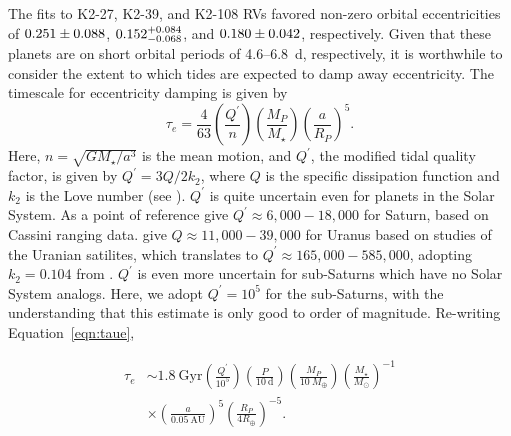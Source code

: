 \documentclass[preprint2]{aastex6}
\newcommand{\Mstar}{\ensuremath{M_{\star}}\xspace}
\newcommand{\Mp}{\ensuremath{M_{P}}\xspace}
\newcommand{\Qprime}{\ensuremath{Q^{\prime}}\xspace}
\newcommand{\Rp}{\ensuremath{R_P}\xspace}
\newcommand{\AU}{\ensuremath{\mathrm{AU}}\xspace}
\newcommand{\Me}{\ensuremath{M_{\oplus}}\xspace}
\renewcommand{\Re}{\ensuremath{R_{\oplus}}\xspace}
\newcommand{\Msun}{\ensuremath{M_{\odot}}\xspace}
\begin{document}
The fits to K2-27, K2-39, and K2-108 RVs favored non-zero orbital eccentricities of $\val{K2-27-ecc}{e1}$, $\val{K2-39-ecc}{e1}$, and $\val{epic2117-ecc}{e1}$, respectively. Given that these planets are on short orbital periods of 4.6--6.8~d, respectively, it is worthwhile to consider the extent to which tides are expected to damp away eccentricity. The timescale for eccentricity damping \citep{Goldreich66} is given by 
\begin{equation}
\label{eqn:taue}
    \tau_e = \frac{4}{63} 
                 \left(\frac{\Qprime}{n}\right) 
                 \left(\frac{\Mp}{\Mstar}\right)
                 \left(\frac{a}{\Rp}\right)^5.
\end{equation}
Here, $n = \sqrt{G \Mstar / a^3}$ is the mean motion, and \Qprime, the modified tidal quality factor, is given by $\Qprime = 3 Q / 2 k_2$, where $Q$ is the specific dissipation function and $k_2$ is the Love number (see \citealt{Goldreich66,Murray99,Mardling04}). \Qprime is quite uncertain even for planets in the Solar System. As a point of reference \cite{Lainey15} give $\Qprime \approx 6,000-18,000$ for Saturn, based on Cassini ranging data. \cite{Tittemore89,Tittemore90} give $Q \approx 11,000-39,000$ for Uranus based on studies of the Uranian satilites, which translates to $\Qprime \approx 165,000-585,000$, adopting $k_2 = 0.104$ from \citep{Gavrilov77}. \Qprime is even more uncertain for sub-Saturns which have no Solar System analogs. Here, we adopt $\Qprime = 10^5$ for the sub-Saturns, with the understanding that this estimate is only good to order of magnitude. Re-writing Equation~\ref{eqn:taue},

\begin{eqnarray}
    \tau_e & \sim 1.8~\mathrm{Gyr} 
                \left(\frac{\Qprime}{10^5}\right) 
                \left(\frac{P}{10~\mathrm{d}}\right)
                \left(\frac{\Mp}{10~\Me}\right)
                \left(\frac{\Mstar}{\Msun}\right)^{-1} \nonumber\\ 
           &    \times \left(\frac{a}{0.05~\AU}\right)^5
                \left(\frac{\Rp}{4 \Re}\right)^{-5}.  \nonumber 
\end{eqnarray}
\end{document}
